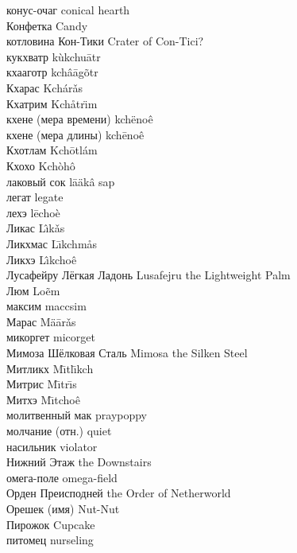 \documentclass[a4paper,10pt,fleqn]{book}
\begin{document}
конус-очаг \hfill conical hearth\\
Конфетка \hfill Candy\\
котловина Кон-Тики \hfill Crater of Con-Tici?\\
кукхватр \hfill k\`{u}kchu\={a}tr\\
кхааготр \hfill kch\^{a}\={a}g\~{o}tr\\
Кхарас \hfill Kch\'{a}r\v{a}s\\
Кхатрим \hfill Kch\r{a}tr\"{\i}m\\
кхене (мера времени) \hfill kch\"{e}no\^{e}\\
кхене (мера длины) \hfill kch\={e}no\^{e}\\
Кхотлам \hfill Kch\={o}tl\'{a}m\\
Кхохо \hfill Kch\`{o}h\^{o}\\
лаковый сок \hfill l\={a}\"{a}k\^{a} sap\\
легат \hfill legate\\
лехэ \hfill l\={e}cho\`{e}\\
Ликас \hfill L\^{\i}k\v{a}s\\
Ликхмас \hfill L\={\i}kchm\r{a}s\\
Ликхэ \hfill L\^{\i}kcho\^{e}\\
Лусафейру Лёгкая Ладонь \hfill Lusafejru the Lightweight Palm\\
Люм \hfill Lo\~{e}m\\
максим \hfill maccsim\\
Марас \hfill M\"{a}\={a}r\v{a}s\\
микоргет \hfill micorget\\
Мимоза Шёлковая Сталь \hfill Mimosa the Silken Steel\\
Митликх \hfill M\={\i}tl\={\i}kch\\
Митрис \hfill M\={\i}tr\={\i}s\\
Митхэ \hfill M\={\i}tcho\^{e}\\
молитвенный мак \hfill praypoppy\\
молчание (отн.) \hfill quiet\\
насильник \hfill violator\\
Нижний Этаж \hfill the Downstairs\\
омега-поле \hfill omega-field\\
Орден Преисподней \hfill the Order of Netherworld\\
Орешек (имя) \hfill Nut-Nut\\
Пирожок \hfill Cupcake\\
питомец \hfill nurseling\\
\end{document}
